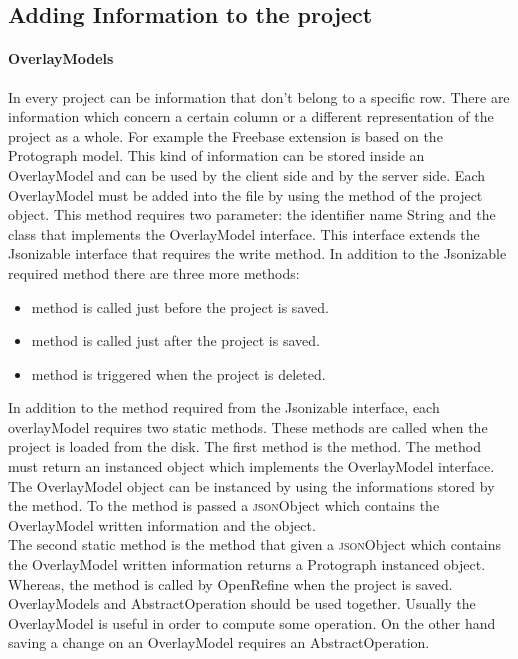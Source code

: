 \subsection{Adding Information to the project}
\paragraph{OverlayModels} In every project can be information that don't belong to a specific row. There are information which concern a certain column or a different representation of the project as a whole. For example the Freebase extension is based on the Protograph model. This kind of information can be stored inside an OverlayModel and can be used by the client side and by the server side. Each OverlayModel must be added into the  file by using the  method of the project object. This method requires two parameter: the identifier name String and the class that implements the OverlayModel interface. This interface extends the Jsonizable interface that requires the write method. In addition to the Jsonizable required method there are three more methods:
\begin{itemize}
	\item {} method is called just before the project is saved.
	\item {} method is called just after the project is saved.
	\item {} method is triggered when the project is deleted.
\end{itemize}
In addition to the method required from the Jsonizable interface, each overlayModel requires two static methods. These methods are called when the project is loaded from the disk. The first method is the  method. The  method must return an instanced object which implements the OverlayModel interface. The OverlayModel object can be instanced by using the informations stored by the  method. To the  method is passed a \textsc{json}Object which contains the OverlayModel written information and the  object. \\
The second static method is the  method that given a \textsc{json}Object which contains the OverlayModel written information returns a Protograph instanced object.\\
Whereas, the  method is called by OpenRefine when the project is saved.\\
OverlayModels and AbstractOperation should be used together. Usually the OverlayModel is useful in order to compute some operation. On the other hand saving a change on an OverlayModel requires an AbstractOperation.

